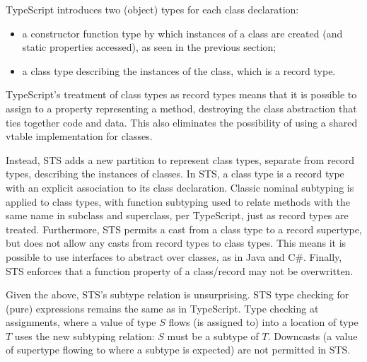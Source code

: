 TypeScript introduces two (object) types for each class declaration:
\begin{itemize}
\item a constructor function type by which instances of a class
are created (and static properties accessed), as seen in the previous section;
\item a class type describing the instances of the class, which is a record type.
\end{itemize}
TypeScript's treatment of class types as record types
means that it is possible to assign to a property representing a method,
destroying the class abstraction that ties together code and data.
This also eliminates the possibility of using a shared vtable implementation for classes.

Instead, STS adds a new partition to represent class types, separate from record types,
describing the instances of classes. In STS, a class type is a
record type with an explicit association to its class declaration.
Classic nominal subtyping is applied to class types, with function subtyping used to relate methods with
the same name in subclass and superclass, per TypeScript, just as record types are treated.
Furthermore, STS permits a cast from a class type
to a record supertype, but does not allow any casts from record types to class types. This means
it is possible to use interfaces to abstract over classes, as in Java and C\#.
Finally, STS enforces that a function property of a class/record may not be overwritten. 

Given the above, STS's subtype relation is unsurprising.
STS type checking for (pure) expressions remains the same as in TypeScript.
Type checking at assignments, where a value of type $S$ flows (is assigned to)
into a location of type $T$ uses the new subtyping relation: $S$
must be a subtype of $T$.  Downcasts (a value of supertype flowing to where a subtype
is expected) are not permitted in STS.



